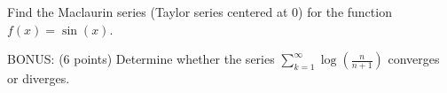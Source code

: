 \documentclass[addpoints,12pt]{exam}
\newcommand {\ds}{\displaystyle}
\begin{document}
\begin{questions}

  \newpage

\question[6] Find the Maclaurin series (Taylor series centered at 0)
  for the function $f(x) = \sin(x)$.
  \vfill
  
\end{questions}

BONUS: (6 points) Determine whether the series $\ds
\sum_{k=1}^{\infty} \log\left( \frac{n}{n+1} \right)$ converges or
diverges.
\vfill


\hrulefill

\end{document}
